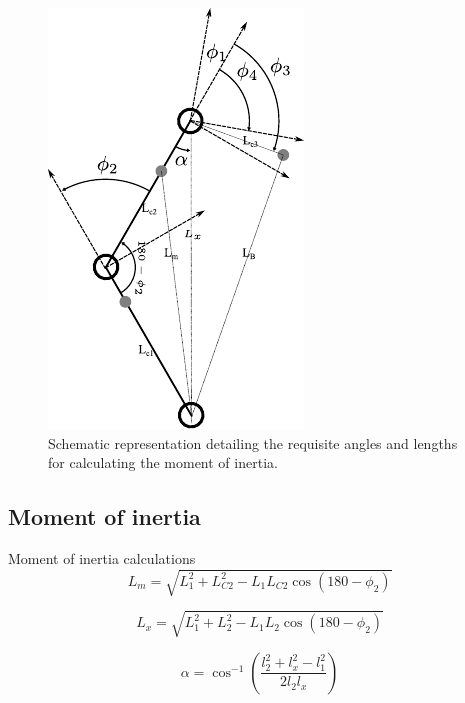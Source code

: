	
	\begin{figure}[h]
		\centering
		\includegraphics[width=.5\textwidth]{Angles}
		\caption[Moment of inertia Schematic representation]{Schematic representation detailing the requisite angles and lengths for calculating the moment of inertia.}
		\label{fig:Schematic representation xxxxx detailing the requisite angles and lengths for calculating the moment of inertia.}
	\end{figure}
	
	\subsection{Moment of inertia}
	Moment of inertia calculations 
	\begin{equation}
		L_m = \sqrt{L_1^2 + L_{C2}^2 - L_1 L_{C2} \cos(180 - \phi_2)}
	\end{equation}
	
	\begin{equation}
		L_{x} = \sqrt{L_1^2 + L_2^2 - L_1 L_2 \cos(180 - \phi_2)}
	\end{equation}
	
	
	\begin{equation}
		\alpha = \cos^{-1} \left( \frac{l_2^2 + l_{x}^2 - l_1^2}{2 l_2 l_{x}} \right) 
	\end{equation}
	
	
